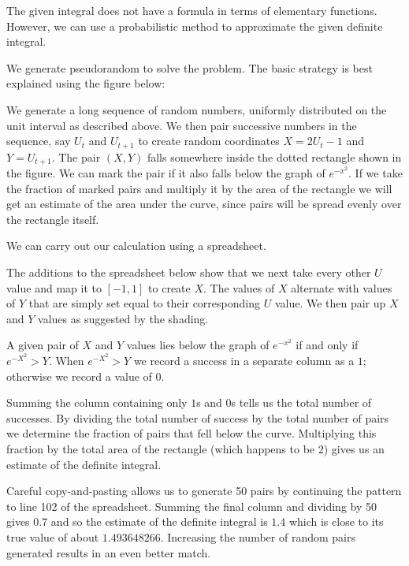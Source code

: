 \documentclass[../book.tex]{subfiles}
\begin{document}
\begin{solution}
The given integral does not have a formula in terms of elementary functions. However, we can use a probabilistic method to approximate the given definite integral.

We generate pseudorandom to solve the problem. The basic strategy is best explained using the figure below:

\begin{center}
  \label{fig:monte-carlo}
\end{center}

We generate a long sequence of random numbers, uniformly distributed on the unit interval as described above. We then pair successive numbers in the sequence, say \(U_t\) and \(U_{t+1}\) to create random coordinates \(X = 2U_t - 1\) and \(Y=U_{t+1}\). The pair \((X,Y)\) falls somewhere inside the dotted rectangle shown in the figure. We can mark the pair if it also falls below the graph of \(e^{-x^2}\). If we take the fraction of marked pairs and multiply it by the area of the rectangle we will get an estimate of the area under the curve, since pairs will be spread evenly over the rectangle itself.

We can carry out our calculation using a spreadsheet.

The additions to the spreadsheet below show that we next take every other \(U\) value and map it to \([-1,1]\) to create \(X\). The values of \(X\) alternate with values of \(Y\) that are simply set equal to their corresponding \(U\) value. We then pair up \(X\) and \(Y\) values as suggested by the shading.

A given pair of \(X\) and \(Y\) values lies below the graph of \(e^{-x^2}\) if and only if \(e^{-X^2}>Y\). When \(e^{-X^2}>Y\) we record a success in a separate column as a \(1\); otherwise we record a value of \(0\).

Summing the column containing only \(1\)s and \(0\)s tells us the total number of successes. By dividing the total number of success by the total number of pairs we determine the fraction of pairs that fell below the curve. Multiplying this fraction by the total area of the rectangle (which happens to be \(2\)) gives us an estimate of the definite integral.

Careful copy-and-pasting allows us to generate 50 pairs by continuing the pattern to line 102 of the spreadsheet. Summing the final column and dividing by 50 gives \(0.7\) and so the estimate of the definite integral is \(1.4\) which is close to its true value of about \(1.493648266\). Increasing the number of random pairs generated results in an even better match.
\end{solution}
\end{document}
